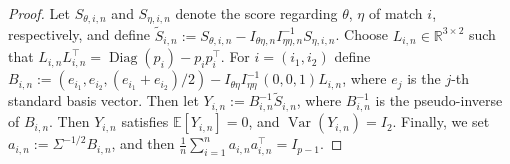 \documentclass[12pt]{article}
\newcommand{\Ee}{{\mathbb{E}}}
\begin{document}
\begin{appendices}



\begin{proof}

Let $S_{\theta,i,n}$ and $S_{\eta,i,n}$ denote the score regarding $\theta$, $\eta$ of match $i$, respectively, and define $\widetilde S_{i,n}:=S_{\theta,i,n}-I_{\theta\eta,n}I_{\eta\eta,n}^{-1}S_{\eta,i,n}$. Choose $L_{i,n}\in\mathbb R^{3\times2}$ such that $L_{i,n}L_{i,n}^\top=\operatorname{Diag}(p_i)-p_ip_i^\top$. 
For $i=(i_1,i_2)$ define 
$B_{i,n}:=(e_{i_1}, e_{i_2},
(e_{i_1}+e_{i_2})/2)-I_{\theta\eta}I_{\eta\eta}^{-1}(0,0,1)L_{i,n}$,
where $e_j$ is the $j$-th standard basis vector.
Then let $Y_{i,n} := B_{i,n}^{-1}\widetilde S_{i,n}$, where
$B_{i,n}^{-1}$ is the pseudo-inverse of $B_{i,n}$. 
Then $Y_{i,n}$ satisfies $\mathbb E[Y_{i,n}]=0$, and $\operatorname{Var}(Y_{i,n})=I_2$. 
Finally, we set $a_{i,n}:=\Sigma^{-1/2}B_{i,n}$, and then
$\frac{1}{n}\sum_{i=1}^n a_{i,n}a_{i,n}^\top=I_{p-1}$.


\end{proof}
\end{appendices}
\end{document}
